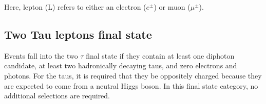 Here, lepton (L) refers to either an electron ($e^{\pm}$) or muon ($\mu^{\pm}$). 





\subsection{Two Tau leptons final state}

Events fall into the two $\tau$ final state if they contain at least one diphoton candidate, at least two hadronically decaying taus, and zero electrons and photons. For the taus, it is required that they be oppositely charged because they are expected to come from a neutral Higgs boson. In this final state category, no additional selections are required. 